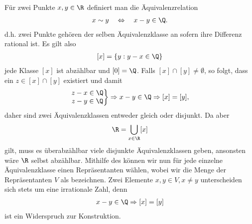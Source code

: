 \documentclass[letterpaper,10pt,german]{jupyterBook}
\begin{document}
\sphinxAtStartPar
Für zwei Punkte \(x,y\in\R\) definiert man die Äquivalenzrelation
\begin{equation*}
\begin{split}x \sim y \quad \Leftrightarrow \quad x-y \in \Q.\end{split}
\end{equation*}
\sphinxAtStartPar
d.h. zwei Punkte gehören der selben Äquivalenzklasse an sofern ihre Differenz rational ist. Es gilt also
\begin{equation*}
\begin{split}[x] = \{y: y-x\in\Q\}\end{split}
\end{equation*}
\sphinxAtStartPar
jede Klasse \([x]\) ist abzählbar und \([0] = \Q\). Falls \([x]\cap [y]\neq \emptyset\), so folgt, dass ein \(z\in[x]\cap [y]\) existiert und damit
\begin{equation*}
\begin{split}\left.
\begin{matrix}
z-x\in\Q\\
z-y\in\Q\\
\end{matrix}
\right\}
\Rightarrow x-y\in\Q\Rightarrow [x]=[y],\end{split}
\end{equation*}
\sphinxAtStartPar
daher sind zwei Äquivalenzklassen entweder gleich oder disjunkt. Da aber
\begin{equation*}
\begin{split}\R = \bigcup_{x\in\R} [x]\end{split}
\end{equation*}
\sphinxAtStartPar
gilt, muss es überabzählbar viele disjunkte Äquivalenzklassen geben, ansonsten wäre \(\R\) selbst abzählbar. Mithilfe des  können wir nun für jede einzelne Äquivalenzklasse einen Repräsentanten wählen, wobei wir die Menge der Repräsentanten \(V\) als  bezeichnen. Zwei Elemente \(x,y\in V, x\neq y\) unterscheiden sich stets um eine irrationale Zahl, denn
\begin{equation*}
\begin{split}x-y\in\Q \Rightarrow [x] = [y]\end{split}
\end{equation*}
\sphinxAtStartPar
ist ein Widerspruch zur Konstruktion.
\end{document}
